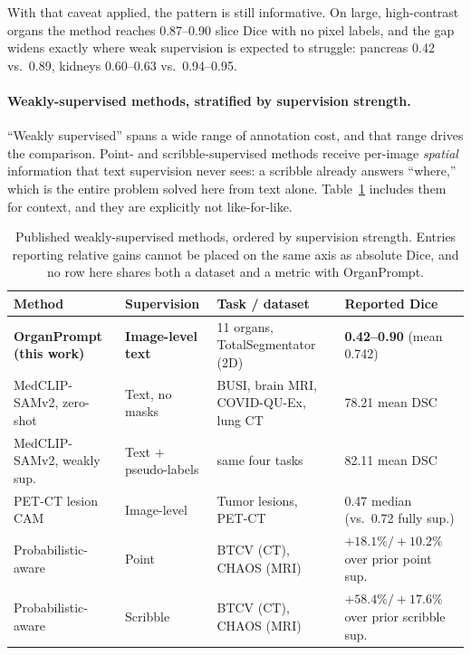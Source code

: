 With that caveat applied, the pattern is still informative. On large,
high-contrast organs the method reaches 0.87--0.90 slice Dice with no pixel
labels, and
the gap widens exactly where weak supervision is expected to struggle: pancreas
0.42 vs.\ 0.89, kidneys 0.60--0.63 vs.\ 0.94--0.95.

\paragraph{Weakly-supervised methods, stratified by supervision strength.}
``Weakly supervised'' spans a wide range of annotation cost, and that range
drives the comparison. Point- and scribble-supervised methods receive per-image
\emph{spatial} information that text supervision never sees: a scribble already
answers ``where,'' which is the entire problem solved here from text alone.
Table~\ref{tab:weaksup} includes them for context, and they are explicitly not
like-for-like.

\begin{table}[t]
\centering
\small
\caption{Published weakly-supervised methods, ordered by supervision strength.
Entries reporting relative gains cannot be placed on the same axis as absolute
Dice, and no row here shares both a dataset and a metric with OrganPrompt.}
\label{tab:weaksup}
\begin{tabularx}{\textwidth}{@{}l l X X@{}}
\toprule
Method & Supervision & Task / dataset & Reported Dice \\
\midrule
\textbf{OrganPrompt (this work)} & \textbf{Image-level text} & 11 organs, TotalSegmentator (2D) & \textbf{0.42--0.90} (mean 0.742) \\
MedCLIP-SAMv2, zero-shot \cite{koleilat2025medclipsamv2} & Text, no masks & BUSI, brain MRI, COVID-QU-Ex, lung CT & 78.21 mean DSC \\
MedCLIP-SAMv2, weakly sup.\ \cite{koleilat2025medclipsamv2} & Text $+$ pseudo-labels & same four tasks & 82.11 mean DSC \\
PET-CT lesion CAM \cite{fruh2021petct} & Image-level & Tumor lesions, PET-CT & 0.47 median (vs.\ 0.72 fully sup.) \\
Probabilistic-aware \cite{jiang2024probabilistic} & Point & BTCV (CT), CHAOS (MRI) & $+18.1\%/+10.2\%$ over prior point sup. \\
Probabilistic-aware \cite{jiang2024probabilistic} & Scribble & BTCV (CT), CHAOS (MRI) & $+58.4\%/+17.6\%$ over prior scribble sup. \\
\bottomrule
\end{tabularx}
\end{table}


